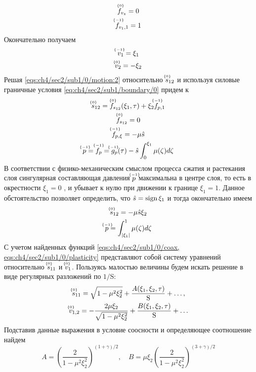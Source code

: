 \begin{gather*}
  \uindex{f}{0}_{v_{z}} = 0
  \\
  \uindex{f}{-1}_{v_{1},1} = 1
\end{gather*}
Окончательно получаем
\begin{gather}
  \label{sol:ch4/sec2/sub1/v1/-1}
  \uindex{v}{-1}_{1} = \xi_1
  \\
  \label{sol:ch4/sec2/sub1/v2/0}
  \uindex{v}{0}_{2} =  -\xi_2
\end{gather}
Решая \cref{eqs:ch4/sec2/sub1/0/motion:2} относительно $\uindex{s}{0}_{12}$ и используя силовые граничные условия \cref{eq:ch4/sec2/sub1/boundary/0} придем к
\begin{gather*}
  \uindex{s}{0}_{12} = \uindex{f}{0}_{s_{12}}(\xi_1, \tau) + \xi_2  \uindex{f}{-1}_{p,1}
  \\
  \uindex{f}{0}_{s_{12}} = 0
  \\
  \uindex{f}{-1}_{p,\xi} = -\mu \hat{s}
  \\
  \uindex{p}{-1}=\uindex{f}{-1}_{p} =\uindex{g}{-1}_{p}(\tau) -\hat{s}\int_0^{\xi_1}{\mu(\zeta)d\zeta}
\end{gather*}
В соответствии с физико-механическим смыслом процесса сжатия и растекания слоя сингулярная составляющая давления $\uindex{p}{-1}$ максимальна в центре слоя, то есть в окрестности $\xi_1 = 0$ , и убывает к нулю при движении к границе $\xi_1=1$. Данное обстоятельство позволяет определить, что $\hat{s} = \sign{\xi_1}$ и тогда окончательно имеем
\begin{gather}
  \label{sol:ch4/sec2/sub1/s12/0}
  \uindex{s}{0}_{12} = -\mu \hat{s} \xi_2
  \\
  \label{sol:ch4/sec2/sub1/p/-1}
  \uindex{p}{-1} = \int_{\vert\xi_1\vert}^1{\mu(\zeta)d\zeta}
\end{gather}
С учетом найденных функций \cref{eqs:ch4/sec2/sub1/0/coax, eqs:ch4/sec2/sub1/0/plasticity} представляют собой систему уравнений относительно $\uindex{s}{0}_{11}$ и $\uindex{v}{0}_{1}$.
Пользуясь малостью величины будем искать решение в виде регулярных разложений по $1/\text{S}$:
\begin{gather}
  \uindex{s}{0}_{11} = \sqrt{1-\mu^2\xi_2^2} + \frac{A(\xi_1,\xi_2,\tau)}{\text{S}} + \ldots, \\
  \uindex{v}{0}_{1,2} = -\frac{2\mu \xi_2}{\sqrt{1-\mu^2\xi_2^2}} + \frac{B(\xi_1,\xi_2,\tau)}{\text{S}} + \ldots
\end{gather}
Подставив данные выражения в условие соосности и определяющее соотношение найдем
\begin{equation}
  A=\left(\frac{2}{1-\mu^2\xi_2^2}\right)^{(1+\gamma)/2}, \quad B = \mu \xi_2 \left(\frac{2}{1-\mu^2\xi_2^2}\right)^{(3+\gamma)/2}
\end{equation}
